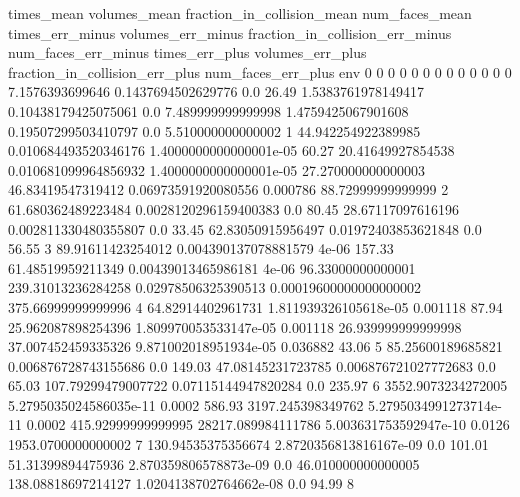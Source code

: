 times_mean	volumes_mean	fraction_in_collision_mean	num_faces_mean	times_err_minus	volumes_err_minus	fraction_in_collision_err_minus	num_faces_err_minus	times_err_plus	volumes_err_plus	fraction_in_collision_err_plus	num_faces_err_plus	env
0	0	0	0	0	0	0	0	0	0	0	0	0
7.1576393699646	0.1437694502629776	0.0	26.49	1.5383761978149417	0.10438179425075061	0.0	7.489999999999998	1.4759425067901608	0.19507299503410797	0.0	5.510000000000002	1
44.942254922389985	0.010684493520346176	1.4000000000000001e-05	60.27	20.41649927854538	0.010681099964856932	1.4000000000000001e-05	27.270000000000003	46.83419547319412	0.06973591920080556	0.000786	88.72999999999999	2
61.680362489223484	0.0028120296159400383	0.0	80.45	28.67117097616196	0.002811330480355807	0.0	33.45	62.83050915956497	0.01972403853621848	0.0	56.55	3
89.91611423254012	0.004390137078881579	4e-06	157.33	61.48519959211349	0.00439013465986181	4e-06	96.33000000000001	239.31013236284258	0.02978506325390513	0.00019600000000000002	375.66999999999996	4
64.82914402961731	1.811939326105618e-05	0.001118	87.94	25.962087898254396	1.809970053533147e-05	0.001118	26.939999999999998	37.007452459335326	9.871002018951934e-05	0.036882	43.06	5
85.25600189685821	0.006876728743155686	0.0	149.03	47.08145231723785	0.006876721027772683	0.0	65.03	107.79299479007722	0.07115144947820284	0.0	235.97	6
3552.9073234272005	5.2795035024586035e-11	0.0002	586.93	3197.245398349762	5.2795034991273714e-11	0.0002	415.92999999999995	28217.089984111786	5.003631753592947e-10	0.0126	1953.0700000000002	7
130.94535375356674	2.8720356813816167e-09	0.0	101.01	51.31399894475936	2.870359806578873e-09	0.0	46.010000000000005	138.08818697214127	1.0204138702764662e-08	0.0	94.99	8
